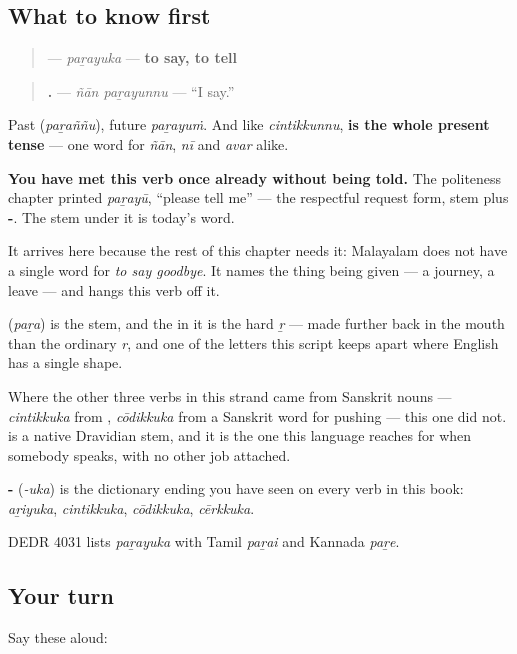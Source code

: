 \subsection*{What to know first}
\begin{quote}
\textbf{} — \emph{paṟayuka} — \textbf{to say, to tell}
\end{quote}

\begin{quote}
\textbf{ .} — \emph{ñān paṟayunnu} — \textquotedblleft{}I say.\textquotedblright{}
\end{quote}

Past \textbf{} (\emph{paṟaññu}), future \emph{paṟayuṁ}. And like \emph{cintikkunnu}, \textbf{ is the whole present tense} — one word for \emph{ñān}, \emph{nī} and \emph{avar} alike.

\textbf{You have met this verb once already without being told.} The politeness chapter printed \emph{paṟayū}, \textquotedblleft{}please tell me\textquotedblright{} — the respectful request form, stem plus \textbf{-}. The stem under it is today's word.

It arrives here because the rest of this chapter needs it: Malayalam does not have a single word for \emph{to say goodbye}. It names the thing being given — a journey, a leave — and hangs this verb off it.

\begin{cousinweb}
\textbf{} (\emph{paṟa}) is the stem, and the \textbf{} in it is the hard \emph{ṟ} — made further back in the mouth than the ordinary \emph{r}, and one of the letters this script keeps apart where English has a single shape.

Where the other three verbs in this strand came from Sanskrit nouns — \emph{cintikkuka} from \textbf{}, \emph{cōdikkuka} from a Sanskrit word for pushing — this one did not. \textbf{} is a native Dravidian stem, and it is the one this language reaches for when somebody speaks, with no other job attached.

\textbf{-} (\emph{-uka}) is the dictionary ending you have seen on every verb in this book: \emph{aṟiyuka}, \emph{cintikkuka}, \emph{cōdikkuka}, \emph{cērkkuka}.

DEDR 4031 lists \emph{paṟayuka} with Tamil \emph{paṟai} and Kannada \emph{paṟe}.
\end{cousinweb}

\subsection*{Your turn}
Say these aloud:

